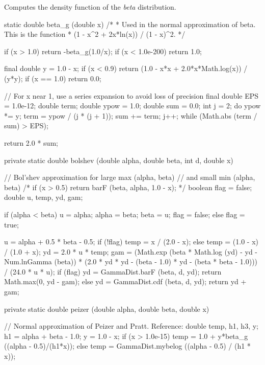 \begin{tabb} Computes the density function of the {\em beta\/} distribution.
\end{tabb}
\begin{code}\begin{hide}

   static double beta_g (double x)
   /*
    * Used in the normal approximation of beta. This is the function
    * (1 - x^2 + 2x*ln(x)) / (1 - x)^2.
    */
   {
      if (x > 1.0)
         return -beta_g(1.0/x);
      if (x < 1.0e-200)
         return 1.0;

      final double y = 1.0 - x;
      if (x < 0.9)
         return (1.0 - x*x + 2.0*x*Math.log(x)) / (y*y);
      if (x == 1.0)
         return 0.0;

      // For x near 1, use a series expansion to avoid loss of precision
      final double EPS = 1.0e-12;
      double term;
      double ypow = 1.0;
      double sum = 0.0;
      int j = 2;
      do {
         ypow *= y;
         term = ypow / (j * (j + 1));
         sum += term;
         j++;
      } while (Math.abs (term / sum) > EPS);

      return 2.0 * sum;
   }


   private static double bolshev (double alpha, double beta, int d, double x) {
      // Bol'shev approximation for large max (alpha, beta)
      // and small min (alpha, beta)
     /* if (x > 0.5)
         return barF (beta, alpha, 1.0 - x); */
      boolean flag = false;
      double u, temp, yd, gam;

      if (alpha < beta) {
         u = alpha;
         alpha = beta;
         beta = u;
         flag = false;
      } else
         flag = true;

      u = alpha + 0.5 * beta - 0.5;
      if (!flag)
         temp = x / (2.0 - x);
      else
         temp = (1.0 - x) / (1.0 + x);
      yd = 2.0 * u * temp;
      gam = (Math.exp (beta * Math.log (yd) - yd -
             Num.lnGamma (beta)) * (2.0 * yd * yd - (beta - 1.0) * yd -
             (beta * beta - 1.0))) / (24.0 * u * u);
      if (flag) {
         yd = GammaDist.barF (beta, d, yd);
         return Math.max(0, yd - gam);
      } else {
         yd = GammaDist.cdf (beta, d, yd);
         return yd + gam;
      }
   }


   private static double peizer (double alpha, double beta, double x) {
      // Normal approximation of Peizer and Pratt.   Reference: \cite{tPEI68a}
      double temp, h1, h3, y;
      h1 = alpha + beta - 1.0;
      y = 1.0 - x;
      if (x > 1.0e-15)
         temp = 1.0 + y*beta_g ((alpha - 0.5)/(h1*x));
      else
         temp = GammaDist.mybelog ((alpha - 0.5) / (h1 * x));

}
\end{hide}
\end{code}
